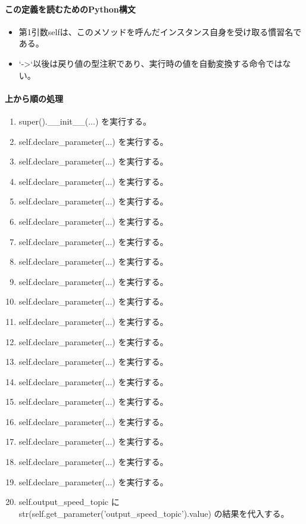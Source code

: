 \documentclass[a4paper,11pt]{article}
\begin{document}
            \paragraph{この定義を読むためのPython構文}
            \begin{itemize}[leftmargin=1.6em]
            \item 第1引数selfは、このメソッドを呼んだインスタンス自身を受け取る慣習名である。
\item `->`以後は戻り値の型注釈であり、実行時の値を自動変換する命令ではない。
            \end{itemize}
            \paragraph{上から順の処理}
            \begin{enumerate}[leftmargin=1.8em]
            \item super().\_\_init\_\_(...) を実行する。
\item self.declare\_parameter(...) を実行する。
\item self.declare\_parameter(...) を実行する。
\item self.declare\_parameter(...) を実行する。
\item self.declare\_parameter(...) を実行する。
\item self.declare\_parameter(...) を実行する。
\item self.declare\_parameter(...) を実行する。
\item self.declare\_parameter(...) を実行する。
\item self.declare\_parameter(...) を実行する。
\item self.declare\_parameter(...) を実行する。
\item self.declare\_parameter(...) を実行する。
\item self.declare\_parameter(...) を実行する。
\item self.declare\_parameter(...) を実行する。
\item self.declare\_parameter(...) を実行する。
\item self.declare\_parameter(...) を実行する。
\item self.declare\_parameter(...) を実行する。
\item self.declare\_parameter(...) を実行する。
\item self.declare\_parameter(...) を実行する。
\item self.declare\_parameter(...) を実行する。
\item self.output\_speed\_topic に str(self.get\_parameter('output\_speed\_topic').value) の結果を代入する。

\end{enumerate}
\end{document}
